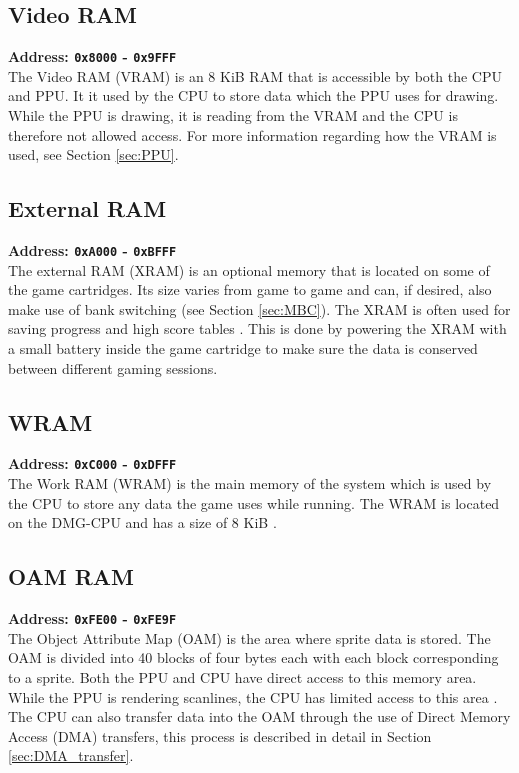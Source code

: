 \subsection{Video RAM}
\textbf{Address: \texttt{0x8000} - \texttt{0x9FFF}}
\\
The Video RAM (VRAM) is an 8 KiB RAM \cite{pandocsmemorymap} that is accessible by both the CPU and PPU. 
It it used by the CPU to store data which the PPU uses for drawing. 
While the PPU is drawing, it is reading from the VRAM and the CPU is therefore not allowed access. 
For more information regarding how the VRAM is used, see Section \ref{sec:PPU}.


\subsection{External RAM}
\textbf{Address: \texttt{0xA000} - \texttt{0xBFFF}}
\\
The external RAM (XRAM) is an optional memory that is located on some of the game cartridges. Its size varies from game to game and can, if desired, also make use of bank switching (see Section \ref{sec:MBC}). The XRAM is often used for saving progress and high score tables \cite{pandocsmemorymap}. This is done by powering the XRAM with a small battery inside the game cartridge to make sure the data is conserved between different gaming sessions. 
\subsection{WRAM}
\textbf{Address: \texttt{0xC000} - \texttt{0xDFFF}}
\\
The Work RAM (WRAM) is the main memory of the system which is used by the CPU to store any data the game uses while running. The WRAM is located on the DMG-CPU and has a size of 8 KiB \cite{pandocsmemorymap}.


\subsection{OAM RAM}
\textbf{Address: \texttt{0xFE00} - \texttt{0xFE9F}}
\\
The Object Attribute Map (OAM) is the area where sprite data is stored. The OAM is divided into 40 blocks of four bytes each with each block corresponding to a sprite. Both the PPU and CPU have direct access to this memory area. While the PPU is rendering scanlines, the CPU has limited access to this area \cite{pandocsoam}. The CPU can also transfer data into the OAM through the use of Direct Memory Access (DMA) transfers, this process is described in detail in Section \ref{sec:DMA_transfer}.


